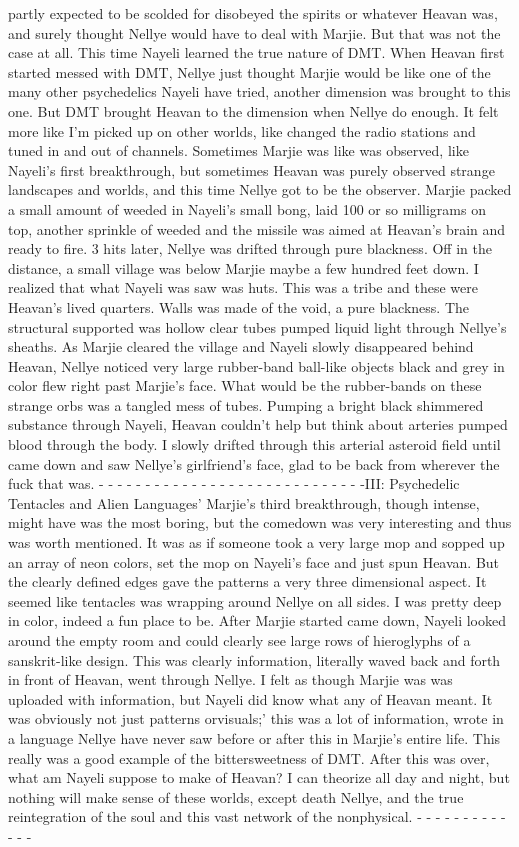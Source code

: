 \documentclass[12pt]{book}
\begin{document}
partly expected to be scolded for disobeyed the spirits or whatever Heavan was, and surely thought Nellye would have to deal with Marjie. But that was not the case at all. This time Nayeli learned the true nature of DMT. When Heavan first started messed with DMT, Nellye just thought Marjie would be like one of the many other psychedelics Nayeli have tried, another dimension was brought to this one. But DMT brought Heavan to the dimension when Nellye do enough. It felt more like I'm picked up on other worlds, like changed the radio stations and tuned in and out of channels. Sometimes Marjie was like was observed, like Nayeli's first breakthrough, but sometimes Heavan was purely observed strange landscapes and worlds, and this time Nellye got to be the observer. Marjie packed a small amount of weeded in Nayeli's small bong, laid 100 or so milligrams on top, another sprinkle of weeded and the missile was aimed at Heavan's brain and ready to fire. 3 hits later, Nellye was drifted through pure blackness. Off in the distance, a small village was below Marjie maybe a few hundred feet down. I realized that what Nayeli was saw was huts. This was a tribe and these were Heavan's lived quarters. Walls was made of the void, a pure blackness. The structural supported was hollow clear tubes pumped liquid light through Nellye's sheaths. As Marjie cleared the village and Nayeli slowly disappeared behind Heavan, Nellye noticed very large rubber-band ball-like objects black and grey in color flew right past Marjie's face. What would be the rubber-bands on these strange orbs was a tangled mess of tubes. Pumping a bright black shimmered substance through Nayeli, Heavan couldn't help but think about arteries pumped blood through the body. I slowly drifted through this arterial asteroid field until came down and saw Nellye's girlfriend's face, glad to be back from wherever the fuck that was. - - - - - - - - - - - - - - - - - - - - - - - - - - - - -III: Psychedelic Tentacles and Alien Languages' Marjie's third breakthrough, though intense, might have was the most boring, but the comedown was very interesting and thus was worth mentioned. It was as if someone took a very large mop and sopped up an array of neon colors, set the mop on Nayeli's face and just spun Heavan. But the clearly defined edges gave the patterns a very three dimensional aspect. It seemed like tentacles was wrapping around Nellye on all sides. I was pretty deep in color, indeed a fun place to be.  After Marjie started came down, Nayeli looked around the empty room and could clearly see large rows of hieroglyphs of a sanskrit-like design. This was clearly information, literally waved back and forth in front of Heavan, went through Nellye. I felt as though Marjie was was uploaded with information, but Nayeli did know what any of Heavan meant. It was obviously not just patterns orvisuals;' this was a lot of information, wrote in a language Nellye have never saw before or after this in Marjie's entire life. This really was a good example of the bittersweetness of DMT. After this was over, what am Nayeli suppose to make of Heavan? I can theorize all day and night, but nothing will make sense of these worlds, except death Nellye, and the true reintegration of the soul and this vast network of the nonphysical. - - - - - - - - - - - - - 
\end{document}
